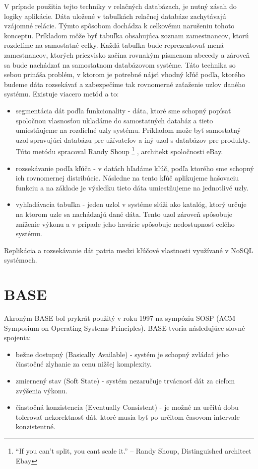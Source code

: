 \documentclass[11pt,twoside,a4paper]{book}
\begin{document}
V prípade použitia tejto techniky v relačných databázach, je nutný zásah do logiky aplikácie. Dáta uložené v tabuľkách relačnej databáze zachytávajú vzájomné relácie. Týmto spôsobom dochádza k celkovému narušeniu tohoto konceptu. Príkladom môže byť tabuľka obsahujúca zoznam zamestnancov, ktorú rozdelíme na samostatné celky. Každá tabuľka bude reprezentovať mená zamestnancov, ktorých priezvisko začína rovnakým písmenom abecedy a zároveň sa bude nachádzať na samostatnom databázovom systéme. Táto technika so sebou prináša problém, v ktorom je potrebné nájsť vhodný kľúč podľa, ktorého budeme dáta rozsekávať a zabezpečíme tak rovnomerné zaťaženie uzlov daného systému. Existuje viacero metód \cite{cassandraBook} a to:
\begin{itemize}
 \item 
      segmentácia dát poďla funkcionality - dáta, ktoré sme schopný popísať spoločnou vlasnosťou ukladáme do samostatných databáz a tieto umiestňujeme na rozdielné uzly systému. Príkladom može byť samostatný uzol spravujúci databázu pre užívateľov a iný uzol s databázov pre produkty. Túto metódu spracoval Randy Shoup  \footnote{“If you can’t split, you cant scale it.” -- Randy Shoup, Distinguished architect Ebay} \cite{ebayShard}, architekt spoločnosti eBay.
  \item
      rozsekávanie podľa kľúča - v datách hľadáme kľúč, podľa ktorého sme schopný ich rovnomernej distribúcie. Následne na tento kľúč aplikujeme hašovaciu funkciu a na základe je výsledku tieto dáta umiestňujeme na jednotlivé uzly.
  \item
      vyhľadávacia tabuľka - jeden uzlol v systéme slúži ako katalóg, ktorý určuje na ktorom uzle sa nachádzajú dané dáta. Tento uzol zároveň spôsobuje zníženie výkonu a v prípade jeho havárie spôsobuje nedostupnosť celého systému.
\end{itemize}

Replikácia a rozsekávanie dát patria medzi kľúčové vlastnosti využívané v NoSQL systémoch.


\section{BASE} %

Akroným BASE \cite{BASE} bol prykrát použitý v roku 1997 na sympóziu SOSP (ACM Symposium on Operating Systems Principles). BASE tvoria následujúce slovné spojenia: 
\begin{itemize}
  \item bežne dostupný (Basically Available) - systém je schopný zvládať jeho čiastočné zlyhanie za cenu nižšej komplexity.
  \item zmiernený stav (Soft State) - systém nezaručuje trvácnosť dát za cieľom zvýšenia výkonu.
  \item čiastočná konzistencia (Eventually Consistent) - je možné na určitú dobu tolerovať nekorektnosť dát, ktoré musia byť po určitom časovom intervale konzistentné.
\end{itemize}
\end{document}
